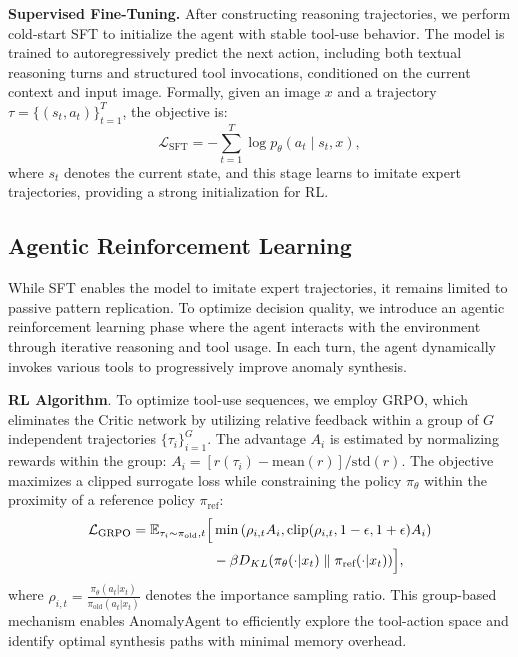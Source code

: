 \documentclass[sigconf]{acmart}
\begin{document}
\noindent\textbf{Supervised Fine-Tuning.}
After constructing reasoning trajectories, we perform cold-start SFT to initialize the agent with stable tool-use behavior. The model is trained to autoregressively predict the next action, including both textual reasoning turns and structured tool invocations, conditioned on the current context and input image. Formally, given an image $x$ and a trajectory $\tau=\{(s_t,a_t)\}_{t=1}^T$, the objective is:
\begin{equation}
\mathcal{L}_{\text{SFT}} = - \sum_{t=1}^{T} \log p_{\theta}(a_t \mid s_t, x),
\end{equation}
where $s_t$ denotes the current state, and this stage learns to imitate expert trajectories, providing a strong initialization for RL.

\subsection{Agentic Reinforcement Learning}

While SFT enables the model to imitate expert trajectories, it remains limited to passive pattern replication. To optimize decision quality, we introduce an agentic reinforcement learning phase where the agent interacts with the environment through iterative reasoning and tool usage. In each turn, the agent dynamically invokes various tools to progressively improve anomaly synthesis.

\noindent\textbf{RL Algorithm}.
To optimize tool-use sequences, we employ GRPO\cite{DBLP:journals/corr/abs-2402-03300}, which eliminates the Critic network by utilizing relative feedback within a group of $G$ independent trajectories $\{\tau_i\}_{i=1}^G$. The advantage $A_i$ is estimated by normalizing rewards within the group: $A_i = [r(\tau_i) - \mathrm{mean}(r)] / \mathrm{std}(r)$. The objective maximizes a clipped surrogate loss while constraining the policy $\pi_\theta$ within the proximity of a reference policy $\pi_{\text{ref}}$:
\begin{equation}
\begin{aligned}
\mathcal{L}_{\text{GRPO}} = \mathbb{E}_{\tau_i \sim \pi_{\text{old}}, t} \Bigl[ & \min \left( \rho_{i,t} A_i, \text{clip}(\rho_{i,t}, 1-\epsilon, 1+\epsilon) A_i \right) \\
& - \beta D_{KL}(\pi_\theta(\cdot|x_t) \parallel \pi_{\text{ref}}(\cdot|x_t)) \Bigr],
\end{aligned}
\end{equation}
where $\rho_{i,t} = \frac{\pi_\theta(a_t|x_t)}{\pi_{\text{old}}(a_t|x_t)}$ denotes the importance sampling ratio. This group-based mechanism enables AnomalyAgent to efficiently explore the tool-action space and identify optimal synthesis paths with minimal memory overhead.
\end{document}
